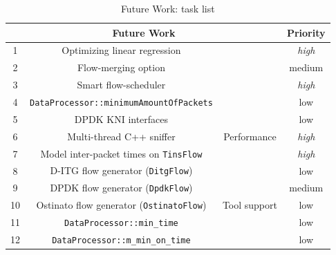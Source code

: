\begin{table}[ht!]
	\centering
	\caption{Future Work: task list}
	\label{tab:task-list}
	\begin{tabular}{cccc}
		\hline
		\multicolumn{3}{c}{Future Work}	& Priority \\ \hline
		1                      & Optimizing linear regression                              &                                                 & \textit{high}                    \\
		2                      & Flow-merging option                                       &                                                 & medium                  \\
		3                      & Smart flow-scheduler                                      &                                                 & \textit{high}                    \\
		4                      & \texttt{DataProcessor::minimumAmountOfPackets}                         &                                                 & low                     \\
		5                      & DPDK KNI interfaces                                       &                                                 & low                     \\
		6                      & Multi-thread C++ sniffer                                  & \multirow{-6}{*}{Performance}                   & \textit{high}                    \\ \hline
		7                      & Model inter-packet times on \texttt{TinsFlow}           &                                                 & \textit{high}                    \\
		8                      & D-ITG flow generator (\texttt{DitgFlow})                &                                                 & low                     \\
		9                      & DPDK flow generator (\texttt{DpdkFlow})                 &                                                 & medium                     \\
		10                     & Ostinato flow generator (\texttt{OstinatoFlow})         & \multirow{-4}{*}{Tool support}                  & low                     \\ \hline
		11                     & \texttt{DataProcessor::min\_time}                       &                                                 & low                     \\
		12                     & \texttt{DataProcessor::m\_min\_on\_time}                &                                                 & low                     \\

\end{tabular}
\end{table}
